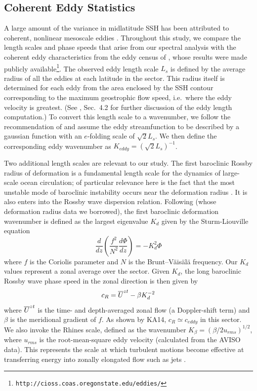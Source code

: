 \documentclass[10pt]{article}
\newcommand{\od}[2]{\ensuremath{\frac{d #1}{d #2}}}
\newcommand{\ol}{\ensuremath{\overline}}
\begin{document}
\subsection{Coherent Eddy Statistics}

A large amount of the variance in midlatitude SSH has been attributed to coherent, nonlinear mesoscale eddies \citep{CheltonEtAl2011}. Throughout this study, we compare the length scales and phase speeds that arise from our spectral analysis with the coherent eddy characteristics from the eddy census of \citet{CheltonEtAl2011}, whose results were made publicly available\footnote{{\tt http://cioss.coas.oregonstate.edu/eddies/}}. The observed eddy length scale $L_s$ is defined by the average radius of all the eddies at each latitude in the sector. This radius itself is determined for each eddy from the area enclosed by the SSH contour corresponding to the maximum geostrophic flow speed, i.e.~where the eddy velocity is greatest. (See \citealt{CheltonEtAl2011}, Sec.~4.2 for further discussion of the eddy length computation.) To convert this length scale to a wavenumber, we follow the recommendation of \citet{CheltonEtAl2011} and assume the eddy streamfunction to be described by a gaussian function with an $e$-folding scale of $\sqrt{2} L_s$. We then define the corresponding eddy wavenumber as $K_{eddy} = (\sqrt{2} L_s)^{-1}$.

Two additional length scales are relevant to our study. The first baroclinic Rossby radius of deformation is a fundamental length scale for the dynamics of large-scale ocean circulation; of particular relevance here is the fact that the most unstable mode of baroclinic instability occurs near the deformation radius \citep{CheltonEtAl1998,Stammer1998,Smith2007}. It is also enters into the Rossby wave dispersion relation. Following \citet{TullochEtAl2009} (whose deformation radius data we borrowed), the first baroclinic deformation wavenumber is defined as the largest eigenvalue $K_d$ given by the Sturm-Liouville equation
\begin{equation}
\od{}{z}\left (\frac{f^2}{N^2} \od{\Phi}{z} \right ) = - K_d^2 \Phi
\end{equation}
where $f$ is the Coriolis parameter and $N$ is the Brunt--V{\"a}is{\"a}l{\"a} frequency. Our $K_d$ values represent a zonal average over the sector. Given $K_d$, the long baroclinic Rossby wave phase speed in the zonal direction is then given by
\begin{equation}
c_R = \ol{U}^{zt}  - \beta K_d^{-2}
\label{eq:c_R}
\end{equation}
where $\ol{U}^{zt}$ is the time- and depth-averaged zonal flow (a Doppler-shift term) and $\beta$ is the meridional gradient of $f$. As shown by KA14, $c_R \simeq c_{eddy}$ in this sector. We also invoke the Rhines scale, defined as the wavenumber $K_\beta = (\beta / 2 u_{rms} )^{1/2}$, where $u_{rms}$ is the root-mean-square eddy velocity (calculated from the AVISO data). This represents the scale at which turbulent motions become effective at transferring energy into zonally elongated flow such as jets \citep{Rhines1975,VallisMaltrud1993}.
\end{document}
